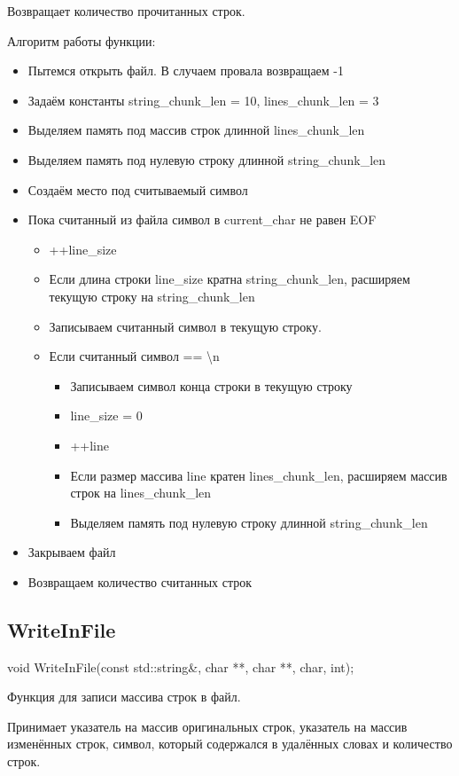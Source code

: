 \documentclass[12pt,a4paper]{article}  %
\begin{document}
	Возвращает количество прочитанных строк.
	
	Алгоритм работы функции:
	
	\begin{itemize}
		\item Пытемся открыть файл. В случаем провала возвращаем -1
		\item Задаём константы string\_chunk\_len = 10, lines\_chunk\_len = 3
		\item Выделяем память под массив строк длинной lines\_chunk\_len
		\item Выделяем память под нулевую строку длинной string\_chunk\_len
		\item Создаём место под считываемый символ
		\item Пока считанный из файла символ в current\_char не равен EOF
		\begin{itemize}
			\item ++line\_size
			\item Если длина строки line\_size кратна string\_chunk\_len, расширяем текущую строку на string\_chunk\_len
			\item Записываем считанный символ в текущую строку.
			\item Если считанный символ == \textbackslash n
			\begin{itemize}
				\item Записываем символ конца строки в текущую строку
				\item line\_size = 0
				\item ++line
				\item Если размер массива line кратен lines\_chunk\_len, расширяем массив строк на lines\_chunk\_len
				\item Выделяем память под нулевую строку длинной string\_chunk\_len
			\end{itemize}
		\end{itemize}
		\item Закрываем файл
		\item Возвращаем количество считанных строк
	\end{itemize}
	
	\subsection*{WriteInFile}
	void WriteInFile(const std::string\&, char **, char **, char, int);
	
	Функция для записи массива строк в файл.
	
	Принимает указатель на массив оригинальных строк, указатель на массив изменённых строк, символ, который содержался в удалённых словах и количество строк.
	
\end{document}

